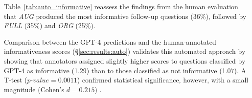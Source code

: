 

Table~\ref{tab:auto_informative} reassess the findings from the human evaluation that \textit{AUG} produced the most informative follow-up questions (36\%), followed by \textit{FULL} (35\%) and \textit{ORG} (25\%). 

Comparison between the GPT-4 predictions and the human-annotated informativeness scores (\S\ref{sec:results:auto}) validates this automated approach by showing that annotators assigned slightly higher scores to questions classified by GPT-4 as informative (1.29) than to those classified as not informative (1.07). A T-test ($\textit{p-value} = 0.0011$) confirmed statistical significance, however, with a small magnitude (Cohen's $d = 0.215$) \cite{cohen2013statistical}. %



